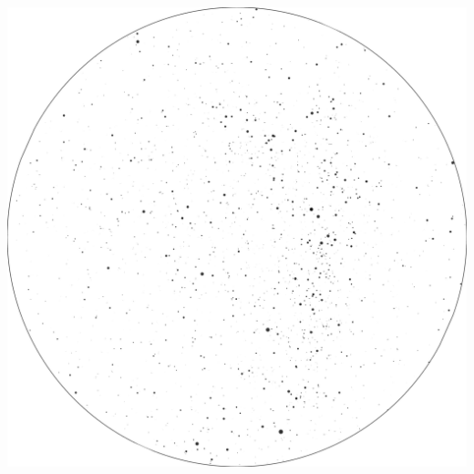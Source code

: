 \documentclass{./SAS-class-skygen}
\begin{document}
	\vspace{0.5cm}
    \begin{center}
    \includegraphics[width=\textwidth]{./pics/skychart57.png}
    \end{center}
    
    
\end{document}

